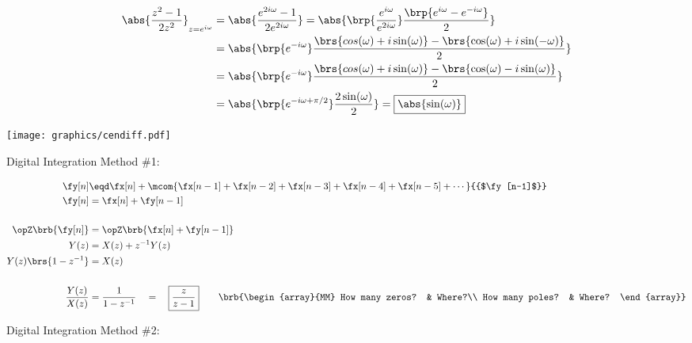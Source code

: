 \begin{align*}
  \abs{\frac{z^2-1}{2z^2}}_{z=e^{i\omega}}
    &= \abs{\frac{e^{2i\omega}-1}
                 {2e^{2i\omega}}
           }
     = \abs{\brp{\frac{e^{i\omega}}{e^{2i\omega}}}
            \frac{\brp{e^{i\omega}-e^{-i\omega}}}{2}
           }
  \\&= \abs{\brp{e^{-i\omega}}
            \frac{\brs{cos(\omega)+i\sin(\omega)}-\brs{\cos(\omega)+i\sin(-\omega)}}{2}
           }
  \\&= \abs{\brp{e^{-i\omega}}
            \frac{\brs{cos(\omega)+i\sin(\omega)}-\brs{\cos(\omega)-i\sin(\omega)}}{2}
           }
  \\&= \abs{\brp{e^{-i\omega+\pi/2}}
            \frac{2\sin(\omega)}{2}
           }
     = \boxed{\abs{\sin(\omega)}}
\end{align*}


\texttt{[image: graphics/cendiff.pdf]}



Digital Integration Method \#1: 
 
{\begin{align*}
  \fy[n]
    &\eqd \fx[n] + \mcom{\fx[n-1] + \fx[n-2] + \fx[n-3] + \fx[n-4] + \fx[n-5] + \cdots}{{$\fy[n-1]$}}
  \\
  \fy[n] &=    \fx[n] + \fy[n-1]
  \\\\
  \opZ\brb{\fy[n]} &= \opZ\brb{\fx[n] + \fy[n-1]}
  \\
  Y(z) &= X(z) + z^{-1}Y(z)
  \\
  Y(z)\brs{1-z^{-1}} &= X(z)
  \\\\
  \frac{Y(z)}{X(z)} &= \frac{1}{1-z^{-1}} \quad=\quad \boxed{\frac{z}{z-1}}
  \qquad\brb{\begin{array}{MM}
    How many zeros? & Where?\\
    How many poles? & Where?
  \end{array}}
\end{align*}}


Digital Integration Method \#2: 
 
